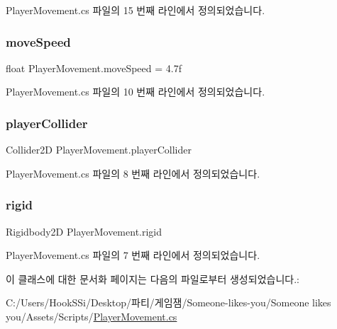 Player\+Movement.\+cs 파일의 15 번째 라인에서 정의되었습니다.

\mbox{\label{class_player_movement_a93207dc2742fe0f0b651a54d610b14aa}} 
\subsubsection{\texorpdfstring{moveSpeed}{moveSpeed}}
{\footnotesize\ttfamily float Player\+Movement.\+move\+Speed = 4.\+7f}



Player\+Movement.\+cs 파일의 10 번째 라인에서 정의되었습니다.

\mbox{\label{class_player_movement_ab59d00c7bd03ee76c94ece406698cdcb}} 
\subsubsection{\texorpdfstring{playerCollider}{playerCollider}}
{\footnotesize\ttfamily Collider2D Player\+Movement.\+player\+Collider\hspace{0.3cm}{\ttfamily [private]}}



Player\+Movement.\+cs 파일의 8 번째 라인에서 정의되었습니다.

\mbox{\label{class_player_movement_a722cf27204e5c715e715d0bbe019f2d4}} 
\subsubsection{\texorpdfstring{rigid}{rigid}}
{\footnotesize\ttfamily Rigidbody2D Player\+Movement.\+rigid\hspace{0.3cm}{\ttfamily [private]}}



Player\+Movement.\+cs 파일의 7 번째 라인에서 정의되었습니다.



이 클래스에 대한 문서화 페이지는 다음의 파일로부터 생성되었습니다.\+:\begin{DoxyCompactItemize}
\item 
C\+:/\+Users/\+Hook\+S\+Si/\+Desktop/파티/게임잼/\+Someone-\/likes-\/you/\+Someone likes you/\+Assets/\+Scripts/\mbox{\hyperlink{_player_movement_8cs}{Player\+Movement.\+cs}}\end{DoxyCompactItemize}

